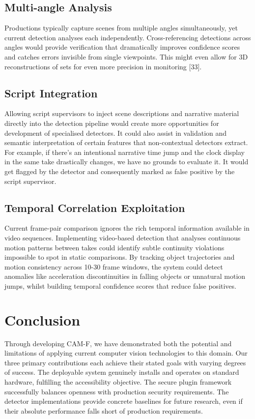 \subsection{Multi-angle Analysis}
Productions typically capture scenes from multiple angles simultaneously, yet current detection analyses each independently. Cross-referencing detections across angles would provide verification that dramatically improves confidence scores and catches errors invisible from single viewpoints. This might even allow for 3D reconstructions of sets for even more precision in monitoring [33].

\subsection{Script Integration}
Allowing script supervisors to inject scene descriptions and narrative material directly into the detection pipeline would create more opportunities for development of specialised detectors. It could also assist in validation and semantic interpretation of certain features that non-contextual detectors extract. For example, if there's an intentional narrative time jump and the clock display in the same take drastically changes, we have no grounds to evaluate it. It would get flagged by the detector and consequently marked as false positive by the script supervisor.

\subsection{Temporal Correlation Exploitation}
Current frame-pair comparison ignores the rich temporal information available in video sequences. Implementing video-based detection that analyses continuous motion patterns between takes could identify subtle continuity violations impossible to spot in static comparisons. By tracking object trajectories and motion consistency across 10-30 frame windows, the system could detect anomalies like acceleration discontinuities in falling objects or unnatural motion jumps, whilst building temporal confidence scores that reduce false positives. 

\section{Conclusion}
Through developing CAM-F, we have demonstrated both the potential and limitations of applying current computer vision technologies to this domain. Our three primary contributions each achieve their stated goals with varying degrees of success. The deployable system genuinely installs and operates on standard hardware, fulfilling the accessibility objective. The secure plugin framework successfully balances openness with production security requirements. The detector implementations provide concrete baselines for future research, even if their absolute performance falls short of production requirements.

